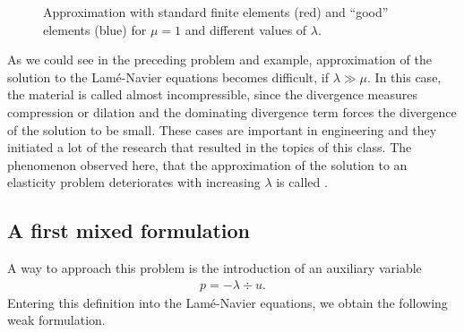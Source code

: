 \begin{figure}[tp]
  \caption{Approximation with standard finite elements (red) and
    ``good'' elements (blue) for $\mu=1$ and different values of
    $\lambda$.}
  \label{fig:elasticity-compressibility}
\end{figure}

\begin{intro}
  As we could see in the preceding problem and example, approximation
  of the solution to the Lamé-Navier equations becomes difficult, if
  $\lambda \gg \mu$. In this case, the material is called almost
  incompressible, since the divergence measures compression or
  dilation and the dominating divergence term forces the divergence of
  the solution to be small. These cases are important in engineering
  and they initiated a lot of the research that resulted in the topics
  of this class. The phenomenon observed here, that the approximation
  of the solution to an elasticity problem deteriorates with
  increasing $\lambda$ is called .
\end{intro}

\subsection{A first mixed formulation}

A way to approach this problem is the introduction of an auxiliary variable
\begin{gather}
  p = -\lambda \div u.
\end{gather}
Entering this definition into the Lamé-Navier equations, we obtain
the following weak formulation.

